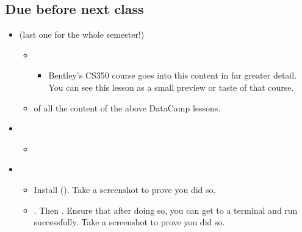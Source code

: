 \documentclass[letterpaper,10pt,english]{sphinxmanual}
\begin{document}
\subsection{Due before next class}
\label{\detokenize{course-schedule:id14}}\begin{itemize}
\item {} 
 (last one for the whole semester!)
\begin{itemize}
\item {} 
\begin{itemize}
\item {} 
 Bentley’s CS350 course goes into this content in far greater detail.  You can see this lesson as a small preview or taste of that course.

\end{itemize}

\item {} 
 of all the content of the above DataCamp lessons.

\end{itemize}

\item {} 
\begin{itemize}
\item {} 
{\hyperref[\detokenize{chapter-14-dashboards::doc}]{}}

\end{itemize}

\item {} 
\begin{itemize}
\item {} 
Install  ().  Take a screenshot to prove you did so.

\item {} 
.  Then .  Ensure that after doing so, you can get to a terminal and run  successfully.  Take a screenshot to prove you did so.


\end{itemize}
\end{itemize}
\end{document}
